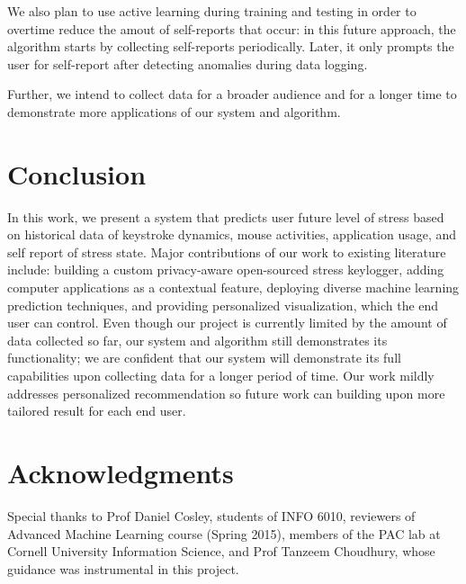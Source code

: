 \documentclass{article}
\begin{document}
We also plan to use active learning during training and testing in order to overtime reduce the amout of self-reports that occur: in this future approach, the algorithm starts by collecting self-reports periodically. Later, it only prompts the user for self-report after detecting anomalies during data logging.

Further, we intend to collect data for a broader audience and for a longer time to demonstrate more applications of our system and algorithm. 

\section{Conclusion}
In this work, we present a system that predicts user future level of stress based on historical data of keystroke dynamics, mouse activities, application usage, and self report of stress state. Major contributions of our work to existing literature include: building a custom privacy-aware open-sourced stress keylogger, adding computer applications as a contextual feature, deploying diverse machine learning prediction techniques, and providing personalized visualization, which the end user can control. Even though our project is currently limited by the amount of data collected so far, our system and algorithm still demonstrates its functionality; we are confident that our system will demonstrate its full capabilities upon collecting data for a longer period of time. Our work mildly addresses personalized recommendation so future work can building upon more tailored result for each end user. 
\section*{Acknowledgments} 
Special thanks to Prof Daniel Cosley, students of INFO 6010, reviewers of Advanced Machine Learning course (Spring 2015), members of the PAC lab at Cornell University Information Science, and Prof Tanzeem Choudhury, whose guidance was instrumental in this project. 


\nocite{keystroke}


\end{document}
